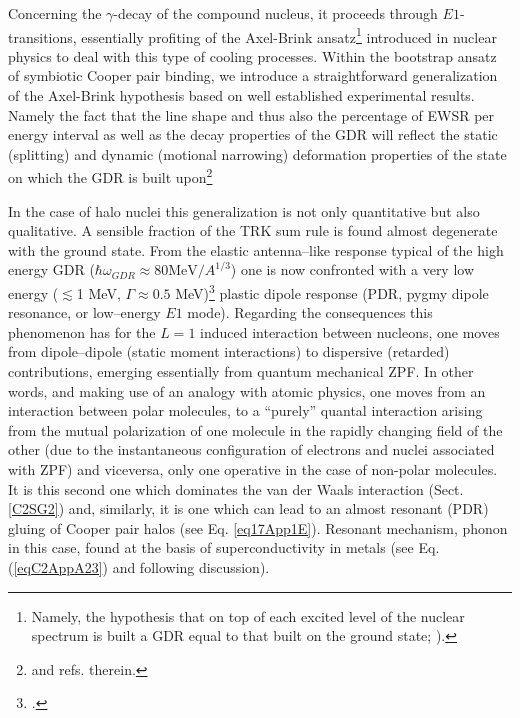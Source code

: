  Concerning the $\gamma$-decay of the compound nucleus, it proceeds through $E1$-transitions, essentially profiting of the Axel-Brink ansatz\footnote{Namely, the hypothesis that on top of each excited level of the nuclear spectrum is built a GDR equal to that built on the ground state; \cite{Axel:62,Brink:55}).} introduced in nuclear physics to deal with this type of cooling processes.
Within the bootstrap ansatz of symbiotic Cooper pair binding, we introduce a straightforward generalization of the Axel-Brink hypothesis based on  well established experimental    results. Namely the fact that the line shape and thus also the percentage of EWSR per energy interval as well as the decay properties of the GDR will reflect the static (splitting) and dynamic (motional narrowing) deformation properties of the state on which the GDR is built upon\footnote{\cite{LeTourneaux:65,Bohr:75,Bortignon:98} and refs. therein.}

In the case of halo nuclei this generalization is not only quantitative but also qualitative. A sensible fraction of the TRK sum rule is found almost degenerate with the ground state. From the elastic antenna--like response typical of the high energy GDR ($\hbar\omega_{GDR}\approx80\text{MeV}/A^{1/3}$)  one is now confronted with a very low energy ($\lesssim$1 MeV, $\Gamma\approx0.5$ MeV)\footnote{\cite{Kanungo:15}.} plastic dipole response (PDR, pygmy dipole resonance, or low--energy $E1$ mode). Regarding the consequences this phenomenon has for the $L=1$ induced interaction between nucleons, one moves from dipole--dipole (static moment interactions) to dispersive (retarded) contributions, emerging essentially from quantum mechanical ZPF. In other words, and making use of an analogy with atomic physics, one moves from an interaction between polar molecules, to a ``purely'' quantal interaction arising from the mutual polarization of one molecule in the rapidly changing field of the other (due to the instantaneous configuration of electrons and nuclei associated with ZPF) and viceversa, only one operative in the case of non-polar molecules. It is this second one which dominates the van der Waals interaction (Sect. \ref{C2SG2}) and, similarly, it is one which can lead to an almost resonant (PDR) gluing of Cooper pair halos (see Eq. \ref{eq17App1E}). Resonant mechanism, phonon in this case,  found  at the basis of superconductivity in metals (see Eq. (\ref{eqC2AppA23}) and  following discussion). 


